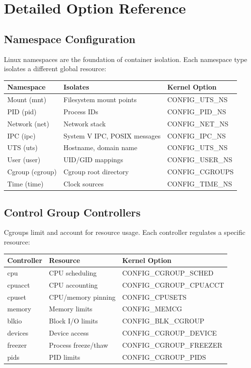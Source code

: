 \section{Detailed Option Reference}

\subsection{Namespace Configuration}

Linux namespaces are the foundation of container isolation. Each namespace
type isolates a different global resource:

\begin{longtable}{|p{3cm}|p{4cm}|p{5cm}|}
\hline
\textbf{Namespace} & \textbf{Isolates} & \textbf{Kernel Option} \\
\hline
Mount (mnt) & Filesystem mount points & CONFIG\_UTS\_NS \\
PID (pid) & Process IDs & CONFIG\_PID\_NS \\
Network (net) & Network stack & CONFIG\_NET\_NS \\
IPC (ipc) & System V IPC, POSIX messages & CONFIG\_IPC\_NS \\
UTS (uts) & Hostname, domain name & CONFIG\_UTS\_NS \\
User (user) & UID/GID mappings & CONFIG\_USER\_NS \\
Cgroup (cgroup) & Cgroup root directory & CONFIG\_CGROUPS \\
Time (time) & Clock sources & CONFIG\_TIME\_NS \\
\hline
\end{longtable}

\subsection{Control Group Controllers}

Cgroups limit and account for resource usage. Each controller regulates
a specific resource:

\begin{longtable}{|p{3cm}|p{4cm}|p{5cm}|}
\hline
\textbf{Controller} & \textbf{Resource} & \textbf{Kernel Option} \\
\hline
cpu & CPU scheduling & CONFIG\_CGROUP\_SCHED \\
cpuacct & CPU accounting & CONFIG\_CGROUP\_CPUACCT \\
cpuset & CPU/memory pinning & CONFIG\_CPUSETS \\
memory & Memory limits & CONFIG\_MEMCG \\
blkio & Block I/O limits & CONFIG\_BLK\_CGROUP \\
devices & Device access & CONFIG\_CGROUP\_DEVICE \\
freezer & Process freeze/thaw & CONFIG\_CGROUP\_FREEZER \\
pids & PID limits & CONFIG\_CGROUP\_PIDS \\
\hline
\end{longtable}

